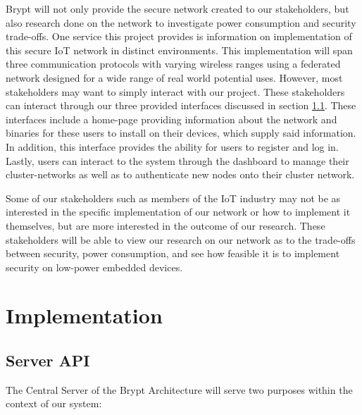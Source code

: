 \documentclass[tikz,a4paper,titlepage]{article}
\begin{document}
Brypt will not only provide the secure network created to our stakeholders, but also research done on the network to investigate power consumption and security trade-offs. One service this project provides is information on implementation of this secure IoT network in distinct environments. This implementation will span three communication protocols with varying wireless ranges using a federated network designed for a wide range of real world potential uses. However, most stakeholders may want to simply interact with our project. These stakeholders can interact through our three provided interfaces discussed in section \ref{server_api}. These interfaces include a home-page providing information about the network and binaries for these users to install on their devices, which supply said information. In addition, this interface provides the ability for users to register and log in. Lastly, users can interact to the system through the dashboard to manage their cluster-networks as well as to authenticate new nodes onto their cluster network.

Some of our stakeholders such as members of the IoT industry may not be as interested in the specific implementation of our network or how to implement it themselves, but are more interested in the outcome of our research. These stakeholders will be able to view our research on our network as to the trade-offs between security, power consumption, and see how feasible it is to implement security on low-power embedded devices.

\section{Implementation}

\subsection{Server API} %
\label{server_api}

The Central Server of the Brypt Architecture will serve two purposes within the context of our system:
\end{document}
